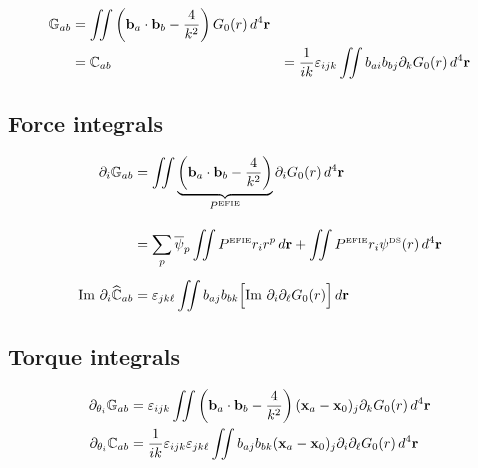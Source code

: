 \documentclass[letterpaper]{article}
\newcommand{\whmb}[1]{\widehat{\mb #1}}
\begin{document}
\begin{align}
 \mathbb{G}_{ab} 
&=
\iint \left( \mathbf{b}_a \cdot \mathbf{b}_b - \frac{4}{k^2}\right) G_0(r) \, d^4 \mathbf{r}
\\
&=
 \mathbb{C}_{ab} &=
 \frac{1}{ik}
 \varepsilon_{ijk}
\iint b_{ai} b_{bj} \partial_k G_0(r) \, d^4 \mathbf{r}
\end{align}

\subsection{Force integrals}

\begin{align}
 \partial_i \mb G_{ab} &=
\iint 
 \underbrace{\left( \vb b_a \cdot \vb b_b - \frac{4}{k^2}\right)}
           _{P\supt{EFIE}}
      \partial_i G_0(r) \, d^4 \vb r
\\[10pt]
 &=
 \sum_p \overline{\psi}_p
 \iint P\supt{EFIE} r_i r^p \, d\vb r
+
 \iint P\supt{EFIE} r_i \psi\supt{DS}(r) \, d^4 \vb r
\\[5pt]
 \text{Im } \partial_i \whmb C_{ab} 
&=
 \varepsilon_{jk\ell}
 \iint b_{aj} b_{bk} 
 \Big[
 \text{Im }\partial_i \partial_\ell G_0(r) 
 \Big] \, d \vb r
\end{align}

\subsection{Torque integrals}

\begin{align}
 \partial_{\theta_i} \mathbb{G}_{ab} 
&=
 \varepsilon_{ijk}
 \iint \left( \mathbf{b}_a \cdot \mathbf{b}_b - \frac{4}{k^2}\right)
       (\mathbf{x}_a-\mathbf{x}_0)_j \partial_k G_0(r) \, d^4 \mathbf{r}
\\
 \partial_{\theta_i} \mathbb{C}_{ab} &=
 \frac{1}{ik}
 \varepsilon_{ijk}
 \varepsilon_{jk\ell}
 \iint b_{aj} b_{bk} 
  (\mathbf{x}_a - \mathbf{x}_0)_j
  \partial_i \partial_\ell G_0(r) \, d^4\mathbf{r}
\end{align}
\end{document}
